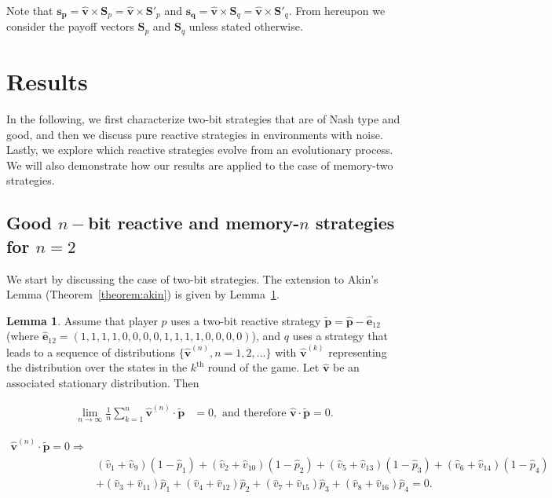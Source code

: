 \documentclass{article}
\theoremstyle{definition}
\newtheorem{lemma}[theorem]{Lemma}
\begin{document}
Note that \(\mathbf{s_{p}} = \mathbf{\hat{v}} \times \mathbf{S}_{p} =
\mathbf{\hat{v}} \times \mathbf{S}'_{p}\) and \(\mathbf{s_{q}} =\mathbf{\hat{v}}
\times \mathbf{S}_{q} = \mathbf{\hat{v}} \times \mathbf{S}'_{q}\). From
hereupon we consider the payoff vectors \(\mathbf{S}_{p}\) and
\(\mathbf{S}_{q}\) unless stated otherwise.

\section{Results}\label{section:results}

In the following, we first characterize two-bit strategies that
are of Nash type and good, and then we discuss pure reactive strategies in
environments with noise. Lastly, we explore which reactive strategies evolve
from an evolutionary process. We will also demonstrate how our results
are applied to the case of memory-two strategies.

\subsection{Good \(n-\)bit reactive and memory-\(n\) strategies for
\(n=2\)}\label{section:good_nash_strategies}

We start by discussing the case of two-bit strategies. The extension to Akin's
Lemma (Theorem~\ref{theorem:akin}) is given by Lemma~\ref{lemma:akin_extended}.

\begin{lemma}\label{lemma:akin_extended}
  Assume that player \(p\) uses a two-bit reactive strategy \(\mathbf{\tilde{p}} = \mathbf{\hat{p}} - \mathbf{\hat{e}}_{1 2}\)
  (where \(\mathbf{\hat{e}}_{1 2} = (1, 1, 1, 1, \allowbreak 0,
  0, 0, 0, 1, 1, 1, 1, 0, 0, 0, 0)\)), and \(q\) uses a strategy that leads to a sequence
  of distributions \(\{\mathbf{\hat{v}}^{(n)}, n = 1, 2, ...\}\) with
  \(\mathbf{\hat{v}}^{(k)}\) representing the distribution over the states in the
  \(k^{\text{th}}\) round of the game. Let \(\mathbf{\hat{v}}\) be an associated
  stationary distribution. Then

  \begin{align*}
    \lim_{n \rightarrow \infty} \frac{1}{n} \sum_{k=1}^{n} \mathbf{\hat{v}}^{(n)} \cdot\mathbf{\tilde{p}} & = 0, \text{ and therefore } \mathbf{\hat{v}} \cdot \mathbf{\tilde{p}} = 0.
  \end{align*}

  \begin{align}\label{eq:akin_extended}
  \mathbf{\hat{v}}^{(n)} \cdot \mathbf{\tilde{p}} = 0 \Rightarrow & \nonumber \\
  & (\hat{v}_{1} + \hat{v}_{9}) (1 - \hat{p}_1) + (\hat{v}_{2} + \hat{v}_{10}) (1 - \hat{p}_2)  + (\hat{v}_{5} + \hat{v}_{13}) (1 - \hat{p}_3) + (\hat{v}_{6} + \hat{v}_{14}) (1 - \hat{p}_4) \nonumber \\
  & + (\hat{v}_{3} + \hat{v}_{11})\hat{p}_1  + (\hat{v}_{4} + \hat{v}_{12})\hat{p}_2 + (\hat{v}_{7} + \hat{v}_{15}) \hat{p}_3 + (\hat{v}_{8} + \hat{v}_{16}) \hat{p}_4 = 0.
  \end{align}
\end{lemma}
\end{document}
